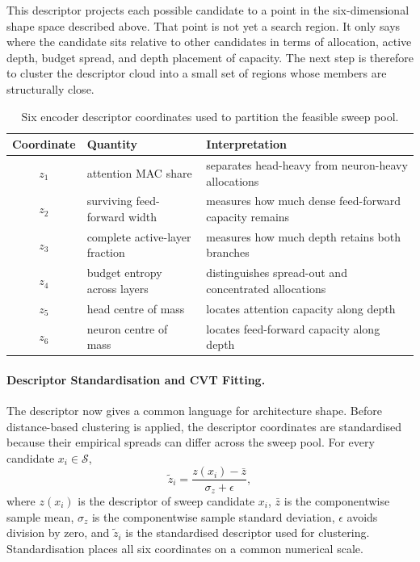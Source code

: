 This descriptor projects each possible candidate to a point in the six-dimensional shape space described above. That point is not yet a search region. It only says where the candidate sits relative to other candidates in terms of allocation, active depth, budget spread, and depth placement of capacity. The next step is therefore to cluster the descriptor cloud into a small set of regions whose members are structurally close. 

\begin{table}[H]
\centering
\footnotesize
\setlength{\tabcolsep}{4pt}
\begin{tabularx}{0.92\textwidth}{c l X}
\toprule
Coordinate & Quantity & Interpretation \\
\midrule
$z_1$ & attention MAC share & separates head-heavy from neuron-heavy allocations \\
$z_2$ & surviving feed-forward width & measures how much dense feed-forward capacity remains \\
$z_3$ & complete active-layer fraction & measures how much depth retains both branches \\
$z_4$ & budget entropy across layers & distinguishes spread-out and concentrated allocations \\
$z_5$ & head centre of mass & locates attention capacity along depth \\
$z_6$ & neuron centre of mass & locates feed-forward capacity along depth \\
\bottomrule
\end{tabularx}
\caption{Six encoder descriptor coordinates used to partition the feasible sweep pool.}
\label{tab:cvt_descriptor}
\end{table}

\paragraph{Descriptor Standardisation and CVT Fitting.}
The descriptor now gives a common language for architecture shape. Before distance-based clustering is applied, the descriptor coordinates are standardised because their empirical spreads can differ across the sweep pool. For every candidate $x_i\in\mathcal{S}$,
\[
\tilde z_i=\frac{z(x_i)-\bar z}{\sigma_z+\epsilon},
\]
where $z(x_i)$ is the descriptor of sweep candidate $x_i$, $\bar z$ is the componentwise sample mean, $\sigma_z$ is the componentwise sample standard deviation, $\epsilon$ avoids division by zero, and $\tilde z_i$ is the standardised descriptor used for clustering. Standardisation places all six coordinates on a common numerical scale.

